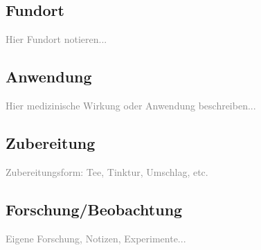 \documentclass[12pt,a4paper]{article}
\begin{document}
\subsection*{Fundort}
\textcolor{gray}{Hier Fundort notieren...}

\subsection*{Anwendung}
\textcolor{gray}{Hier medizinische Wirkung oder Anwendung beschreiben...}

\subsection*{Zubereitung}
\textcolor{gray}{Zubereitungsform: Tee, Tinktur, Umschlag, etc.}

\subsection*{Forschung/Beobachtung}
\textcolor{gray}{Eigene Forschung, Notizen, Experimente...}

\newpage

\end{document}
